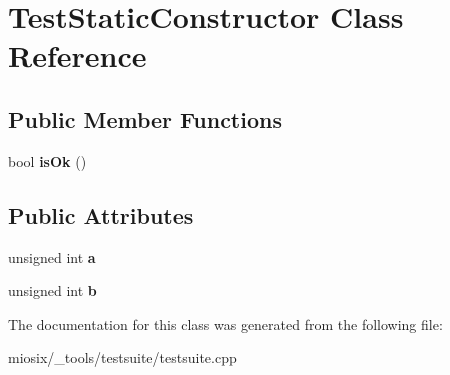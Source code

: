 \hypertarget{class_test_static_constructor}{\section{Test\-Static\-Constructor Class Reference}
\label{class_test_static_constructor}
}
\subsection*{Public Member Functions}
\begin{DoxyCompactItemize}
\item 
\hypertarget{class_test_static_constructor_ad598474e43f2f3ae7a9a17251df28437}{bool {\bfseries is\-Ok} ()}\label{class_test_static_constructor_ad598474e43f2f3ae7a9a17251df28437}

\end{DoxyCompactItemize}
\subsection*{Public Attributes}
\begin{DoxyCompactItemize}
\item 
\hypertarget{class_test_static_constructor_a0eb8d929f9b6a31eccad9683adfa6f5a}{unsigned int {\bfseries a}}\label{class_test_static_constructor_a0eb8d929f9b6a31eccad9683adfa6f5a}

\item 
\hypertarget{class_test_static_constructor_ac8429a10bfbe525dcb8606f0a0f7f0ef}{unsigned int {\bfseries b}}\label{class_test_static_constructor_ac8429a10bfbe525dcb8606f0a0f7f0ef}

\end{DoxyCompactItemize}


The documentation for this class was generated from the following file\-:\begin{DoxyCompactItemize}
\item 
miosix/\-\_\-tools/testsuite/testsuite.\-cpp\end{DoxyCompactItemize}
